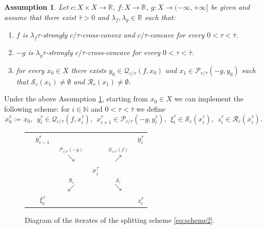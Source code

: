 \documentclass[reqno]{amsart}
\newcounter{results}[section]
\theoremstyle{plain}
\theoremstyle{remark}
\theoremstyle{plain}
\newtheorem{assumption}[results]{Assumption}
\numberwithin{equation}{section}
\theoremstyle{remark}
\newcommand{\N}{\mathbb{N}}
\newcommand{\R}{\mathbb{R}}
\begin{document}
\begin{assumption}\label{ass:ass2}  Let  $c:X \times  X \to \R$, $f:X \to \R$, $g: X \to (-\infty, + \infty]$  be given  and   assume that there exist $\bar{\tau}>0$ and $\lambda_f, \lambda_g \in \R$ such that:
\begin{enumerate}
\item $f$ is $\lambda_f \tau$-strongly $c/\tau$-cross-convex and $c/\tau$-concave for every $0<\tau< \bar{\tau}$.
\item $-g$ is $\lambda_g \tau$-strongly $c/\tau$-cross-concave for every $0<\tau< \bar{\tau}$.
\item for every $x_0 \in X$ there exists $y_0 \in \mathcal{Q}_{c/\tau}(f,x_0)$ and $x_1 \in \mathcal{P}_{c/\tau}(-g,y_0)$ such that $\mathcal{S}_c(x_1)\ne \emptyset$  and $ \mathcal{R}_c(x_1) \ne \emptyset$.
\end{enumerate}
\end{assumption}
Under the above Assumption \ref{ass:ass2}, starting from $x_0 \in X$ we can implement the following scheme: for $i \in  \N $ and $0<\tau< \bar{\tau}$ we define
\begin{equation}\label{eq:scheme2}
x^\tau_0:=x_0, \ \ y_i^\tau \in \mathcal{Q}_{c/\tau}(f,x_i^\tau), \ \ x_{i+1}^\tau \in \mathcal{P}_{c/\tau}(-g, y_i^\tau), \ \ \xi_i^\tau \in \mathcal{S}_c(x_i^\tau), \ \ z_i^\tau \in \mathcal{R}_c(x_i^\tau).
\end{equation}
\begin{figure}[h!]
\begin{tabular}{lccccc}\label{table:scheme_fg}
\hspace{5mm}& $y_{i-1}^\tau$ &  &  &  & $y_{i}^\tau$  \\ 
  & &  $\stackrel{\mathcal{P}_{c/\tau}(-g)}{\searrow}$  &  & $\stackrel{\mathcal{Q}_{c/\tau}(f)}{\nearrow}$ &  \\ 
& &  & $x_i^\tau$  &  &  \\ 
  &  & $\stackrel{\mathcal{R}_c}{\swarrow}$ &  & $\stackrel{\mathcal{S}_c}{\searrow}$  &     \\ 
\hspace{5mm} & $\xi_i^\tau$  &  &  &  & $z_i^\tau$
\end{tabular}
\caption{Diagram of the iterates of the splitting scheme \eqref{eq:scheme2}.
}
\end{figure}
\end{document}
